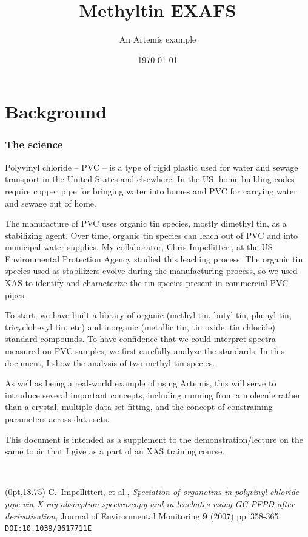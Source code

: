 \documentclass[10pt, xcolor=x11names, compress, handout]{beamer}
\title{Methyltin EXAFS}%
\subtitle{An Artemis example}
\date{\today}
\begin{document}
\maketitle


\section{Background}

\begin{frame}
  \frametitle{The science}
  \footnotesize%
  Polyvinyl chloride -- PVC -- is a type of rigid plastic used for
  water and sewage transport in the United States and elsewhere.  In
  the US, home building codes require copper pipe for bringing water
  into homes and PVC for carrying water and sewage out of home.

  \medskip

  The manufacture of PVC uses organic tin species, mostly dimethyl
  tin, as a stabilizing agent.  Over time, organic tin species can
  leach out of PVC and into municipal water supplies.  My collaborator,
  Chris Impellitteri, at the US Environmental Protection Agency studied
  this leaching process.  The organic tin species used as stabilizers
  evolve during the manufacturing process, so we used XAS to identify
  and characterize the tin species present in commercial PVC pipes.

  \medskip

  To start, we have built a library of organic (methyl tin, butyl tin,
  phenyl tin, tricyclohexyl tin, etc) and inorganic (metallic tin, tin
  oxide, tin chloride) standard compounds.  To have confidence that we
  could interpret spectra measured on PVC samples, we first carefully
  analyze the standards.  In this document, I show the analysis of two
  methyl tin species.

  \medskip

  As well as being a real-world example of using Artemis, this will
  serve to introduce several important concepts, including running
  {\feff} from a molecule rather than a crystal, multiple data set
  fitting, and the concept of constraining parameters across data
  sets.

  \medskip

  This document is intended as a supplement to the
  demonstration/lecture on the same topic that I give as a part of an
  XAS training course.

  \medskip

  ~

  \begin{textblock*}{0.7\linewidth}(0pt,18.75\TPVertModule)%
    \tiny%
    C.\ Impellitteri, et al., \textit{Speciation of organotins in
      polyvinyl chloride pipe via X-ray absorption spectroscopy and in
      leachates using GC-PFPD after derivatisation}, Journal of
    Environmental Monitoring \textbf{9} (2007) pp\ 358-365.
    \href{http://dx.doi.org/10.1039/B617711E}
    {\color{Blue4}\texttt{DOI:10.1039/B617711E}}
  \end{textblock*}
\end{frame}
\end{document}
